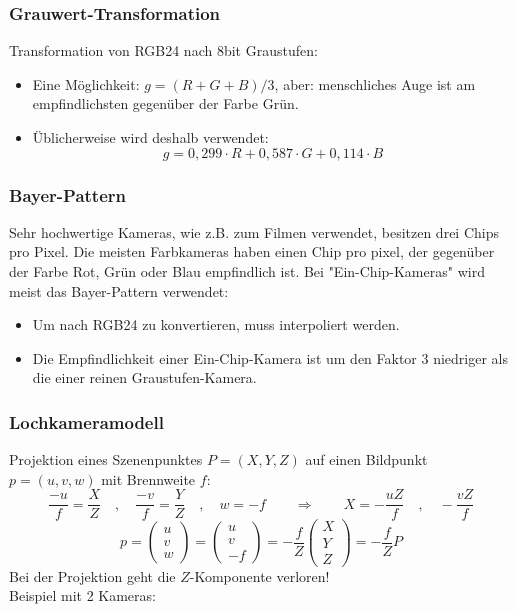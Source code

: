 \subsubsection{Grauwert-Transformation}

Transformation von RGB24 nach 8bit Graustufen:
\begin{itemize}
\item Eine Möglichkeit: $g = (R+G+B)/3$, aber: menschliches Auge ist am empfindlichsten gegenüber der Farbe Grün.
\item Üblicherweise wird deshalb verwendet: $$g = 0,299 \cdot R + 0,587 \cdot G + 0,114 \cdot B$$
\end{itemize}

\subsubsection*{Bayer-Pattern}

Sehr hochwertige Kameras, wie z.B. zum Filmen verwendet, besitzen drei Chips pro Pixel. Die meisten Farbkameras haben einen Chip pro pixel, der gegenüber der Farbe Rot, Grün oder Blau empfindlich ist. Bei "{}Ein-Chip-Kameras"{} wird meist das Bayer-Pattern verwendet:
\begin{itemize}
\item Um nach RGB24 zu konvertieren, muss interpoliert werden.
\item Die Empfindlichkeit einer Ein-Chip-Kamera ist um den Faktor 3 niedriger als die einer reinen Graustufen-Kamera.
\end{itemize}

\subsubsection*{Lochkameramodell}


Projektion eines Szenenpunktes $P = (X,Y,Z)$ auf einen Bildpunkt $p = (u,v,w)$ mit Brennweite $f$:
$$\frac{-u}{f} = \frac{X}{Z} \quad , \quad \frac{-v}{f} = \frac{Y}{Z} \quad , \quad w = -f \qquad \Rightarrow \qquad X = - \frac{uZ}{f} \quad , \quad - \frac{vZ}{f}$$
$$p = \left( \begin{array}{c} u \\ v \\ w \end{array} \right) = \left( \begin{array}{c} u \\ v \\ -f \end{array} \right) = - \frac{f}{Z} \left( \begin{array}{c} X \\ Y \\ Z \end{array} \right) = - \frac{f}{Z} P$$
Bei der Projektion geht die $Z$-Komponente verloren! \\
Beispiel mit 2 Kameras:

